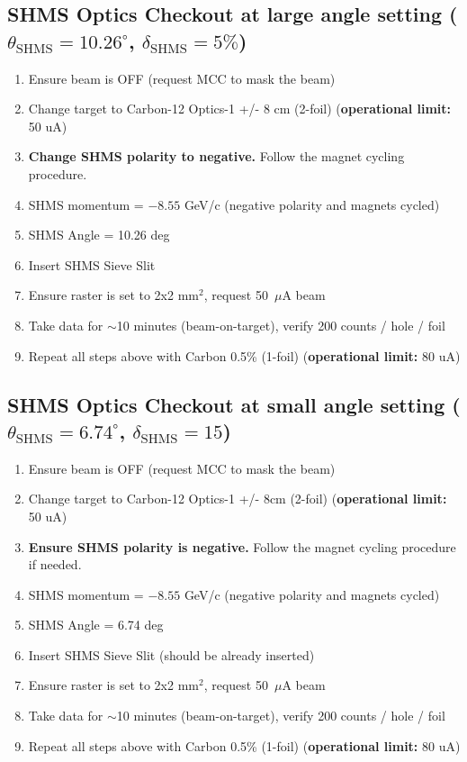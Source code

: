 \documentclass{article}
\begin{document}
\subsection*{SHMS Optics Checkout at large angle setting ($\theta_{\mathrm{SHMS}} =10.26^{\circ}$, $\delta_{\mathrm{SHMS}}=5\%$)}
\begin{enumerate}
    \item Ensure beam is OFF (request MCC to mask the beam)
    \item Change target to Carbon-12 Optics-1 +/- 8 cm (2-foil) (\textbf{operational limit:} 50 uA) 
    \item \textbf{Change SHMS polarity to negative.} Follow the magnet cycling procedure. 
    \item SHMS momentum = $-8.55$ GeV/c (negative polarity and magnets cycled) 
    \item SHMS Angle = 10.26  deg
    \item Insert SHMS Sieve Slit
    \item Ensure raster is set to 2x2 mm$^{2}$, request 50~$\mu$A beam 
    \item Take data for $\sim$10 minutes (beam-on-target), verify 200 counts / hole / foil
    \item Repeat all steps above with Carbon 0.5\% (1-foil) (\textbf{operational limit:} 80 uA)
\end{enumerate}

    \subsection*{SHMS Optics Checkout at small angle setting ($\theta_{\mathrm{SHMS}} =6.74^{\circ}$, $\delta_{\mathrm{SHMS}}=15$)}
\begin{enumerate}
    \item Ensure beam is OFF (request MCC to mask the beam)
    \item Change target to Carbon-12 Optics-1 +/- 8cm (2-foil) (\textbf{operational limit:} 50 uA) 
    \item \textbf{Ensure SHMS polarity is negative.} Follow the magnet cycling procedure if needed.
    \item SHMS momentum = $-8.55$ GeV/c (negative polarity and magnets cycled) 
    \item SHMS Angle = 6.74  deg 
    \item Insert SHMS Sieve Slit (should be already inserted)
    \item Ensure raster is set to 2x2 mm$^{2}$, request 50~$\mu$A beam
    \item Take data for $\sim$10 minutes (beam-on-target), verify 200 counts / hole / foil
    \item Repeat all steps above with Carbon 0.5\% (1-foil) (\textbf{operational limit:} 80 uA)
\end{enumerate}
\newpage
\end{document}
